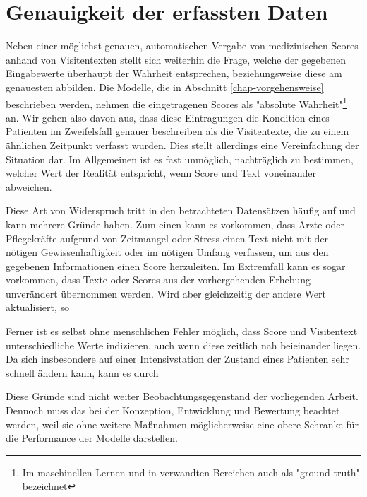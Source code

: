 \section{Genauigkeit der erfassten Daten}
Neben einer möglichst genauen, automatischen Vergabe von medizinischen Scores anhand von Visitentexten stellt sich weiterhin die Frage, welche der gegebenen Eingabewerte überhaupt der Wahrheit entsprechen, beziehungsweise diese am genauesten abbilden. Die Modelle, die in Abschnitt \ref{chap-vorgehensweise} beschrieben werden, nehmen die eingetragenen Scores als "absolute Wahrheit"\footnote{Im maschinellen Lernen und in verwandten Bereichen auch als "ground truth" bezeichnet} an. Wir gehen also davon aus, dass diese Eintragungen die Kondition eines Patienten im Zweifelsfall genauer beschreiben als die Visitentexte, die zu einem ähnlichen Zeitpunkt verfasst wurden. Dies stellt allerdings eine Vereinfachung der Situation dar. Im Allgemeinen ist es fast unmöglich, nachträglich zu bestimmen, welcher Wert der Realität entspricht, wenn Score und Text voneinander abweichen. 

Diese Art von Widerspruch tritt in den betrachteten Datensätzen häufig auf und kann mehrere Gründe haben. Zum einen kann es vorkommen, dass Ärzte oder Pflegekräfte aufgrund von Zeitmangel oder Stress einen Text nicht mit der nötigen Gewissenhaftigkeit oder im nötigen Umfang verfassen, um aus den gegebenen Informationen einen Score herzuleiten. Im Extremfall kann es sogar vorkommen, dass Texte oder Scores aus der vorhergehenden Erhebung unverändert übernommen werden. Wird aber gleichzeitig der andere Wert aktualisiert, so 

Ferner ist es selbst ohne menschlichen Fehler möglich, dass Score und Visitentext unterschiedliche Werte indizieren, auch wenn diese zeitlich nah beieinander liegen. Da sich insbesondere auf einer Intensivstation der Zustand eines Patienten sehr schnell ändern kann, kann es durch


Diese Gründe sind nicht weiter Beobachtungsgegenstand der vorliegenden Arbeit. Dennoch muss das bei der Konzeption, Entwicklung und Bewertung beachtet werden, weil sie ohne weitere Maßnahmen möglicherweise eine obere Schranke für die Performance der Modelle darstellen.